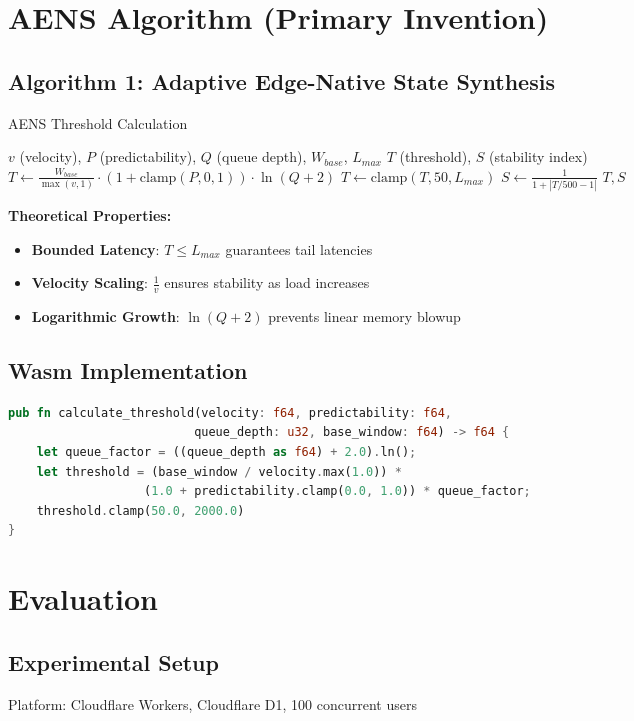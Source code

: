 \documentclass[conference]{IEEEtran}
\begin{document}
\section{AENS Algorithm (Primary Invention)}
\subsection{Algorithm 1: Adaptive Edge-Native State Synthesis}
\begin{algorithm}[h]
\caption{AENS Threshold Calculation}
\begin{algorithmic}[1]
\REQUIRE $v$ (velocity), $P$ (predictability), $Q$ (queue depth), $W_{base}$, $L_{max}$
\ENSURE $T$ (threshold), $S$ (stability index)
\STATE $T \leftarrow \frac{W_{base}}{\max(v, 1)} \cdot (1 + \text{clamp}(P, 0, 1)) \cdot \ln(Q + 2)$
\STATE $T \leftarrow \text{clamp}(T, 50, L_{max})$
\STATE $S \leftarrow \frac{1}{1 + |T/500 - 1|}$
\RETURN $T, S$
\end{algorithmic}
\end{algorithm}

\textbf{Theoretical Properties:}
\begin{itemize}
    \item \textbf{Bounded Latency}: $T \leq L_{max}$ guarantees tail latencies
    \item \textbf{Velocity Scaling}: $\frac{1}{v}$ ensures stability as load increases
    \item \textbf{Logarithmic Growth}: $\ln(Q+2)$ prevents linear memory blowup
\end{itemize}

\subsection{Wasm Implementation}
\begin{lstlisting}[language=Rust, caption=Wasm AENS Engine]
pub fn calculate_threshold(velocity: f64, predictability: f64, 
                          queue_depth: u32, base_window: f64) -> f64 {
    let queue_factor = ((queue_depth as f64) + 2.0).ln();
    let threshold = (base_window / velocity.max(1.0)) * 
                   (1.0 + predictability.clamp(0.0, 1.0)) * queue_factor;
    threshold.clamp(50.0, 2000.0)
}
\end{lstlisting}

\section{Evaluation}
\subsection{Experimental Setup}
Platform: Cloudflare Workers, Cloudflare D1, 100 concurrent users
\end{document}
